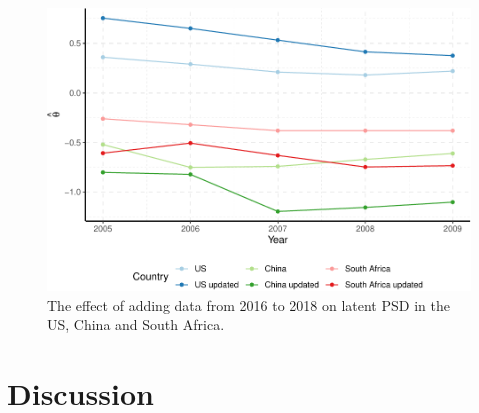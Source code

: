 \documentclass[12pt,english,a4paper,oneside]{article}
\theoremstyle{definition}
\theoremstyle{definition}
\theoremstyle{definition}
\theoremstyle{definition}
\theoremstyle{remark}
\begin{document}
\begin{figure}[H]
\includegraphics[width=\textwidth]{figs/data-1} \caption[The effect of adding data from 2016 to 2018 on latent PSD in the US, China and South Africa]{The effect of adding data from 2016 to 2018 on latent PSD in the US, China and South Africa.}\label{fig:data}
\end{figure}

\hypertarget{discussion}{%
\section{Discussion}\label{discussion}}
\end{document}
